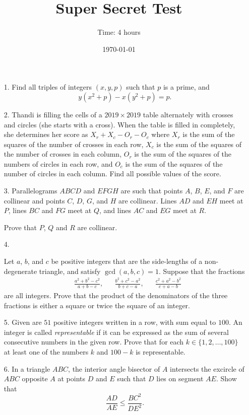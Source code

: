 \documentclass{article}
\title{Super Secret Test} %
\author{Time: 4 hours}
\date{\today} %
\begin{document}
 \maketitle
\thispagestyle{empty}
\vfill
\begin{enumerate}

\item[1.] %
	Find all triples of integers $(x, y, p)$ such that $p$ is a prime, and
	\[
			y(x^2 + p) - x(y^2 + p) = p.
	\]


\item[2.] %
	Thandi is filling the cells of a $2019 \times 2019$ table alternately with crosses and circles (she starts with a cross).
	When the table is filled in completely, she determines her score as $X_r+X_c-O_r-O_c$ where $X_r$ is the sum of the squares of the number of crosses in each row, $X_c$ is the sum of the squares of the number of crosses in each column, $O_r$ is the sum of the squares of the numbers of circles in each row, and $O_c$ is the sum of the squares of the number of circles in each column.
	Find all possible values of the score.


\item[3.] %
	Parallelograms $ABCD$ and $EFGH$ are such that points $A$, $B$, $E$, and $F$ are collinear and points $C$, $D$, $G$, and $H$ are collinear.
	Lines $AD$ and $EH$ meet at $P$, lines $BC$ and $FG$ meet at $Q$, and lines $AC$ and $EG$ meet at $R$.

	Prove that $P$, $Q$ and $R$ are collinear.


\item[4.] %

Let $a$, $b$, and $c$ be positive integers that are the side-lengths of a non-degenerate triangle, and satisfy $\gcd(a, b, c) = 1$.
Suppose that the fractions
\begin{align*}
	& \frac{a^2 + b^2 - c^2}{a + b - c}, && \frac{b^2 + c^2 - a^2}{b + c - a}, && \frac{c^2 + a^2 - b^2}{c + a - b}
\end{align*}
are all integers.
Prove that the product of the denominators of the three fractions is either a square or twice the square of an integer.


\item[5.] %
	Given are $51$ positive integers written in a row, with sum equal to $100$.
	An integer is called \emph{representable} if it can be expressed as the sum of several consecutive numbers in the given row.
	Prove that for each $k \in \{1, 2, \dotsc, 100\}$ at least one of the numbers $k$ and $100-k$ is representable.


\item[6.] %
	In a triangle $ABC$, the interior angle bisector of $A$ intersects the excircle of $ABC$ opposite $A$ at points $D$ and $E$ such that $D$ lies on segment $AE$. Show that
	\[
		\frac{AD}{AE} \leq \frac{BC^2}{DE^2}.
	\]


\end{enumerate}
\vfill
\end{document}
